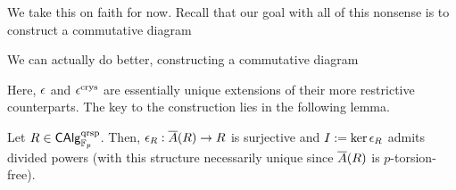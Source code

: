 \documentclass[11pt]{article}
\DeclareMathOperator{\qrsp}{qrsp} %
\DeclareMathOperator{\qsyn}{qsyn} %
\begin{document}
We take this on faith for now. Recall that our goal with all of this nonsense is to construct a commutative diagram
\begin{center}
\end{center}
We can actually do better, constructing a commutative diagram
\begin{center}
\end{center}
Here, $\epsilon$ and $\epsilon^{\operatorname{crys}}$ are essentially unique extensions of their more restrictive counterparts. The key to the construction lies in the following lemma.

\begin{lemma}
Let $R\in\CAlg_{\F_p}^{\qrsp}$. Then, $\epsilon_R: \overline{A}(R)\to R$ is surjective and $I:=\ker\epsilon_R$ admits divided powers (with this structure necessarily unique since $\overline{A}(R)$ is $p$-torsion-free).
\end{lemma}
\end{document}
